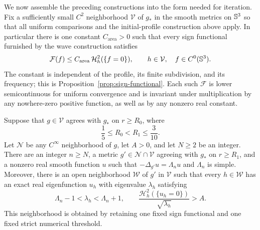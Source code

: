 We now assemble the preceding constructions into the form needed for
iteration.  Fix a sufficiently small $C^2$ neighborhood
$\mathcal V$ of $g_*$ in the smooth metrics on $\mathbb S^3$ so that all
uniform comparisons and the initial-profile construction above
apply.  In particular there is one constant $C_{\mathrm{area}}>0$
such that every sign functional furnished by the wave construction
satisfies
\begin{equation}\label{eq:uniform-certificate-area}
 \mathcal F(f)\le C_{\mathrm{area}}\,
 \mathcal H_h^2(\{f=0\}),\qquad h\in\mathcal V,\quad f\in C^0(\mathbb S^3).
\end{equation}
The constant is independent of the profile, its finite subdivision,
and its frequency; this is Proposition~\ref{prop:sign-functional}.
Each such $\mathcal F$ is lower semicontinuous for uniform convergence
and is invariant under multiplication by any nowhere-zero positive
function, as well as by any nonzero real constant.

\begin{proposition}\label{prop:one-step}
Suppose that $g\in\mathcal V$ agrees with $g_*$ on $r\ge R_0$, where
\[
 \frac15\le R_0<R_1\le\frac3{10}.
\]
Let $\mathcal N$ be any $C^\infty$ neighborhood of $g$, let $A>0$,
and let $N\ge2$ be an integer.  There are an integer $n\ge N$,
a metric $g'\in\mathcal N\cap\mathcal V$ agreeing with $g_*$ on
$r\ge R_1$, and a nonzero real smooth function $u$ such that
$-\Delta_{g'}u=\Lambda_nu$ and $\Lambda_n$ is simple.
Moreover, there is an open neighborhood $\mathcal W$ of $g'$ in
$\mathcal V$ such that every $h\in\mathcal W$ has an exact real
eigenfunction $u_h$ with eigenvalue $\lambda_h$ satisfying
\begin{equation}\label{eq:one-step-open-witness}
 \Lambda_n-1<\lambda_h<\Lambda_n+1,
 \qquad
 \frac{\mathcal H_h^2(\{u_h=0\})}{\sqrt{\lambda_h}}>A.
\end{equation}
This neighborhood is obtained by retaining one fixed sign
functional and one fixed strict numerical threshold.
\end{proposition}

